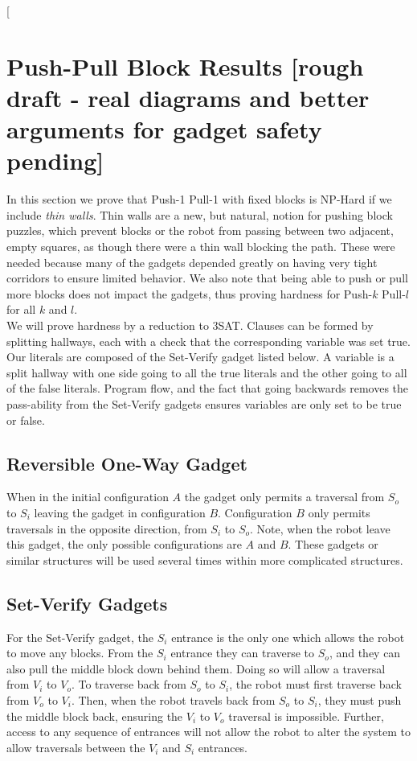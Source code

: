 \documentclass[11pt]{article}
\makeatletter
\gdef\xxx{\@ifnextchar[\xxx@lab\xxx@nolab}
\makeatother
\begin{document}
\xxx{might be more updating, check 6.890}


\section{Push-Pull Block Results  [rough draft - real diagrams and better arguments for gadget safety pending]}
In this section we prove that Push-1 Pull-1 with fixed blocks is NP-Hard if we include \emph{thin walls}. Thin walls are a new, but natural, notion for pushing block puzzles, which prevent blocks or the robot from passing between two adjacent, empty squares, as though there were a thin wall blocking the path. These were needed because many of the gadgets depended greatly on having very tight corridors to ensure limited behavior. We also note that being able to push or pull more blocks does not impact the gadgets, thus proving hardness for Push-$k$ Pull-$l$ for all $k$ and $l$. \\
We will prove hardness by a reduction to 3SAT. Clauses can be formed by splitting hallways, each with a check that the corresponding variable was set true. Our literals are composed of the Set-Verify gadget listed below. A variable is a split hallway with one side going to all the true literals and the other going to all of the false literals. Program flow, and the fact that going backwards removes the pass-ability from the Set-Verify gadgets ensures variables are only set to be true or false.

\subsection{Reversible One-Way Gadget}
When in the initial configuration $A$ the gadget only permits a traversal from $S_o$ to $S_i$ leaving the gadget in configuration $B$. Configuration $B$ only permits traversals in the opposite direction, from $S_i$ to $S_o$. Note, when the robot leave this gadget, the only possible configurations are $A$ and $B$. These gadgets or similar structures will be used several times within more complicated structures.
%

\subsection{Set-Verify Gadgets}
For the Set-Verify gadget, the $S_i$ entrance is the only one which allows the robot to move any blocks. From the $S_i$ entrance they can traverse to $S_o$, and they can also pull the middle block down behind them. Doing so will allow a traversal from $V_i$ to $V_o$. To traverse back from $S_o$ to $S_i$, the robot must first traverse back from $V_o$ to $V_i$. Then, when the robot travels back from $S_o$ to $S_i$, they must push the middle block back, ensuring the $V_i$ to $V_o$ traversal is impossible. Further, access to any sequence of entrances will not allow the robot to alter the system to allow traversals between the $V_i$ and $S_i$ entrances. \\
\end{document}
